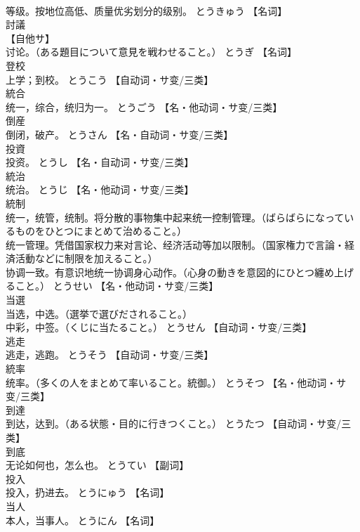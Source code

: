 \documentclass[8pt]{extreport}
\begin{document}
\begin{CJK}{UTF8}{min}
\\	等级。按地位高低、质量优劣划分的级别。	とうきゅう		【名词】
\\	討議	
\\	【自他サ】 
\\	讨论。（ある題目について意見を戦わせること。）	とうぎ		【名词】
\\	登校	
\\	上学；到校。	とうこう		【自动词・サ变/三类】
\\	統合	
\\	统一，综合，统归为一。	とうごう		【名・他动词・サ变/三类】
\\	倒産	
\\	倒闭，破产。	とうさん		【名・自动词・サ变/三类】
\\	投資	
\\	投资。	とうし		【名・自动词・サ变/三类】
\\	統治	
\\	统治。	とうじ		【名・他动词・サ变/三类】
\\	統制	
\\	统一，统管，统制。将分散的事物集中起来统一控制管理。（ばらばらになっているものをひとつにまとめて治めること。） 
\\	统一管理。凭借国家权力来对言论、经济活动等加以限制。（国家権力で言論・経済活動などに制限を加えること。） 
\\	协调一致。有意识地统一协调身心动作。（心身の動きを意図的にひとつ纏め上げること。）	とうせい		【名・他动词・サ变/三类】
\\	当選	
\\	当选，中选。（選挙で選びだされること。） 
\\	中彩，中签。（くじに当たること。）	とうせん		【自动词・サ变/三类】
\\	逃走	
\\	逃走，逃跑。	とうそう		【自动词・サ变/三类】
\\	統率	
\\	统率。（多くの人をまとめて率いること。統御。）	とうそつ		【名・他动词・サ变/三类】
\\	到達	
\\	到达，达到。（ある状態・目的に行きつくこと。）	とうたつ		【自动词・サ变/三类】
\\	到底	
\\	无论如何也，怎么也。	とうてい		【副词】
\\	投入	
\\	投入，扔进去。	とうにゅう		【名词】
\\	当人	
\\	本人，当事人。	とうにん		【名词】

\end{CJK}
\end{document}
